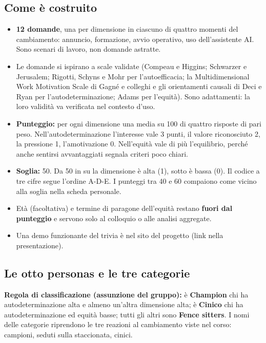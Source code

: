 \documentclass[11pt,a4paper]{article}
\begin{document}
\subsection{Come è costruito}\label{sec:5.2}
\begin{itemize}
\item \textbf{12 domande}, una per dimensione in ciascuno di quattro momenti del cambiamento: annuncio, formazione, avvio operativo, uso dell'assistente AI. Sono scenari di lavoro, non domande astratte.
\item Le domande si ispirano a scale validate (Compeau e Higgins; Schwarzer e Jerusalem; Rigotti, Schyns e Mohr per l'autoefficacia; la Multidimensional Work Motivation Scale di Gagné e colleghi e gli orientamenti causali di Deci e Ryan per l'autodeterminazione; Adams per l'equità). Sono adattamenti: la loro validità va verificata nel contesto d'uso.
\item \textbf{Punteggio:} per ogni dimensione una media su 100 di quattro risposte di pari peso. Nell'autodeterminazione l'interesse vale 3 punti, il valore riconosciuto 2, la pressione 1, l'amotivazione 0. Nell'equità vale di più l'equilibrio, perché anche sentirsi avvantaggiati segnala criteri poco chiari.
\item \textbf{Soglia:} 50. Da 50 in su la dimensione è alta (1), sotto è bassa (0). Il codice a tre cifre segue l'ordine A-D-E. I punteggi tra 40 e 60 compaiono come \guillemotleft{}vicino alla soglia\guillemotright{} nella scheda personale.
\item Età (facoltativa) e termine di paragone dell'equità restano \textbf{fuori dal punteggio} e servono solo al colloquio o alle analisi aggregate.
\item Una demo funzionante del trivia è nel sito del progetto (link nella presentazione).
\end{itemize}

\subsection{Le otto personas e le tre categorie}\label{sec:5.3}
\textbf{Regola di classificazione (assunzione del gruppo):} è \textbf{Champion} chi ha autodeterminazione alta e almeno un'altra dimensione alta; è \textbf{Cinico} chi ha autodeterminazione ed equità basse; tutti gli altri sono \textbf{Fence sitters}. I nomi delle categorie riprendono le tre reazioni al cambiamento viste nel corso: campioni, seduti sulla staccionata, cinici.
\end{document}
